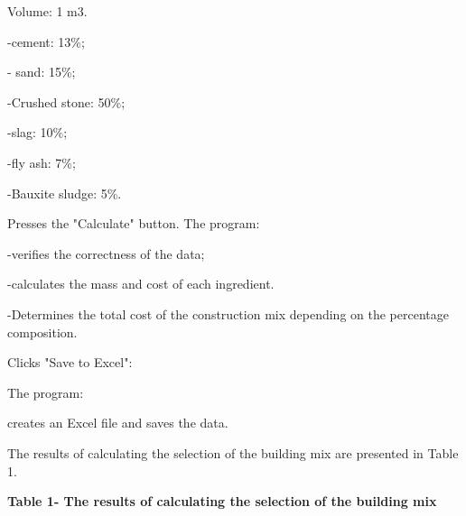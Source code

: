 {Volume: 1 m3.

-cement: 13\%;

- sand: 15\%;

-Crushed stone: 50\%;

-slag: 10\%;

-fly ash: 7\%;

-Bauxite sludge: 5\%.

Presses the "Calculate" button. The program:

-verifies the correctness of the data;

-calculates the mass and cost of each ingredient.

-Determines the total cost of the construction mix depending on the
percentage composition.

Clicks "Save to Excel":

The program:

creates an Excel file and saves the data.

The results of calculating the selection of the building mix are
presented in Table 1.

{\bfseries Table 1- The results of calculating the selection of the
building mix}

}
